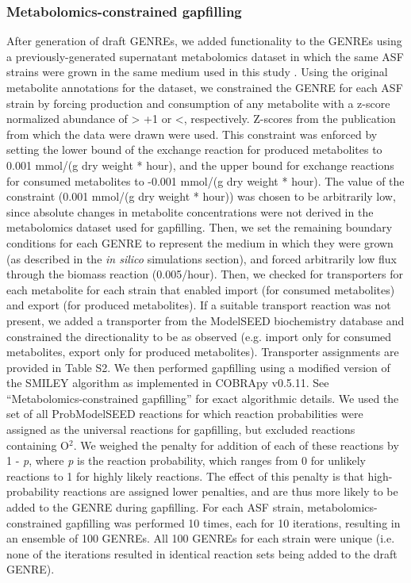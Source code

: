 \documentclass[11pt,twocolumn,notitlepage,openany,twoside]{book}
\begin{document}
\begin{refsection}
\subsubsection{Metabolomics-constrained gapfilling}

After generation of draft GENREs, we added functionality to the GENREs using a previously-generated supernatant metabolomics dataset in which the same ASF strains were grown in the same medium used in this study \cite{Biggs2017-fs}. Using the original metabolite annotations for the dataset, we constrained the GENRE for each ASF strain by forcing production and consumption of any metabolite with a z-score normalized abundance of \textgreater\! +1 or \textless{}, respectively. Z-scores from the publication from which the data were drawn were used. This constraint was enforced by setting the lower bound of the exchange reaction for produced metabolites to 0.001 mmol/(g dry weight * hour), and the upper bound for exchange reactions for consumed metabolites to -0.001 mmol/(g dry weight * hour). The value of the constraint (0.001 mmol/(g dry weight * hour)) was chosen to be arbitrarily low, since absolute changes in metabolite concentrations were not derived in the metabolomics dataset used for gapfilling. Then, we set the remaining boundary conditions for each GENRE to represent the medium in which they were grown (as described in the \textit{in silico} simulations section), and forced arbitrarily low flux through the biomass reaction (0.005/hour). Then, we checked for transporters for each metabolite for each strain that enabled import (for consumed metabolites) and export (for produced metabolites). If a suitable transport reaction was not present, we added a transporter from the ModelSEED biochemistry database and constrained the directionality to be as observed (e.g. import only for consumed metabolites, export only for produced metabolites). Transporter assignments are provided in Table S2. We then performed gapfilling using a modified version of the SMILEY algorithm \cite{Reed2006-qv} as implemented in COBRApy v0.5.11. See “Metabolomics-constrained gapfilling” for exact algorithmic details. We used the set of all ProbModelSEED reactions for which reaction probabilities were assigned as the universal reactions for gapfilling, but excluded reactions containing O$^2$. We weighed the penalty for addition of each of these reactions by 1 - \textit{p}, where \textit{p} is the reaction probability, which ranges from 0 for unlikely reactions to 1 for highly likely reactions. The effect of this penalty is that high-probability reactions are assigned lower penalties, and are thus more likely to be added to the GENRE during gapfilling. For each ASF strain, metabolomics-constrained gapfilling was performed 10 times, each for 10 iterations, resulting in an ensemble of 100 GENREs. All 100 GENREs for each strain were unique (i.e. none of the iterations resulted in identical reaction sets being added to the draft GENRE).


\end{refsection}
\end{document}
